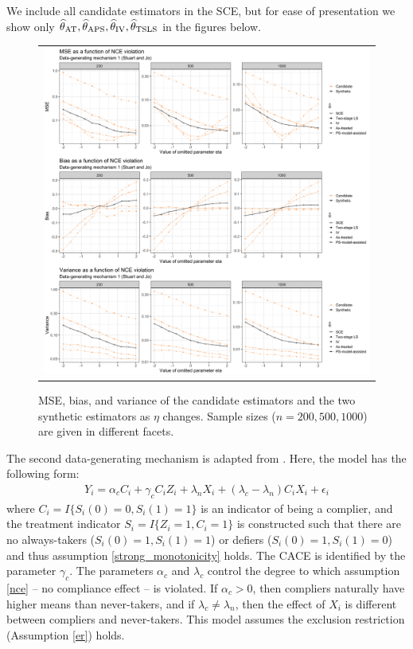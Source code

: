 \documentclass{article}
\def\siv{_{\text{IV}}}
\def\sat{_{\text{AT}}}
\def\stsls{_{\text{TSLS}}}
\def\saps{_{\text{APS}}}
\begin{document}
We include all candidate estimators in the SCE, but for ease of presentation we show only $\thetahat\sat, \thetahat\saps, \thetahat\siv, \thetahat\stsls$ in the figures below. 

\begin{figure}
\centering
\begin{tabular}{c}
\includegraphics[width =\textwidth]{figures/secondary-sim-mse-plot.png}
\end{tabular}\vspace{0.2in}
\caption{MSE, bias, and variance of the candidate estimators and the two synthetic estimators as $\eta$ changes. Sample sizes ($n = 200, 500, 1000$) are given in different facets.}\label{sec-sim-pl}
\end{figure}

The second data-generating mechanism is adapted from \citep{stuart2015assessing}. Here, the model has the following form:
\begin{align}
Y_i = \alpha_c C_i + \gamma_cC_iZ_i + \lambda_n X_i + (\lambda_c - \lambda_n)C_iX_i + \epsilon_i
\end{align}
where $C_i = I\{S_i(0) = 0, S_i(1) = 1\}$ is an indicator of being a complier, and the treatment indicator $S_i = I\{Z_i = 1, C_i = 1\}$ is constructed such that there are no always-takers ($S_i(0) = 1, S_i(1) = 1$) or defiers ($S_i(0) = 1, S_i(1) = 0$) and thus assumption \ref{strong_monotonicity} holds. The CACE is identified by the parameter $\gamma_c$. The parameters $\alpha_c$ and $\lambda_c$ control the degree to which assumption \ref{nce} -- no compliance effect -- is violated. If $\alpha_c > 0$, then compliers naturally have higher means than never-takers, and if $\lambda_c \neq \lambda_n$, then the effect of $X_i$ is different between compliers and never-takers. This model assumes the exclusion restriction (Assumption \ref{er}) holds.
\end{document}
